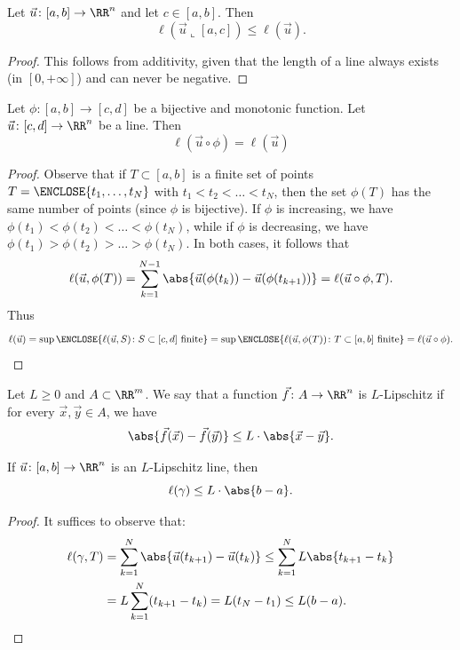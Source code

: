 \begin{corollary}[monotonicity]
Let $\vec u\colon[a,b]\to \RR^n$ and let $c\in [a,b]$. Then 
\[
\ell(\vec u \llcorner [a,c]) \le \ell(\vec u).  
\]
\end{corollary}
\begin{proof}
This follows from additivity, given that the length of a line always exists (in
$[0,+\infty]$) and can never be negative.
\end{proof}

\begin{theorem}[reparameterization]
Let $\phi\colon [a,b] \to [c,d]$ be a bijective and monotonic function. Let
$\vec u \colon [c,d]\to \RR^n$ be a line. Then
\[
 \ell(\vec u \circ \phi) = \ell(\vec u)  
\]
\end{theorem}
\begin{proof}
Observe that if $T\subset [a,b]$ is a finite set of points $T=\ENCLOSE{t_1,
\dots, t_N}$ with $t_1 < t_2 < \dots < t_N$, then the set $\phi(T)$ has the same
number of points (since $\phi$ is bijective). If $\phi$ is increasing, we have
$\phi(t_1) < \phi(t_2) < \dots < \phi(t_N)$, while if $\phi$ is decreasing, we
have $\phi(t_1) > \phi(t_2) > \dots > \phi(t_N)$. In both cases, it follows that
\[
  \ell(\vec u, \phi(T)) 
  = \sum_{k=1}^{N-1} \abs{\vec u(\phi(t_k)) - \vec u(\phi(t_{k+1}))} 
  = \ell(\vec u \circ \phi, T).
\]
Thus 
\[
\ell(\vec u) 
= \sup\ENCLOSE{\ell(\vec u, S)\colon S\subset [c,d] \text{ finite}} 
= \sup\ENCLOSE{\ell(\vec u,\phi(T))\colon T\subset [a,b] \text{ finite} }
= \ell(\vec u\circ \phi).
\]
\end{proof}

\begin{definition}
Let $L\ge 0$ and $A\subset \RR^m$. We say that a function $\vec f\colon A \to
\RR^n$ is $L$-Lipschitz if for every $\vec x, \vec y\in A$, we have
\[
  \abs{\vec f(\vec x)-\vec f(\vec y)} \le L \cdot \abs{\vec x-\vec y}.  
\]
\end{definition}

\begin{lemma}
If $\vec u \colon [a,b]\to \RR^n$ is an $L$-Lipschitz line, then 
\[
 \ell(\gamma) \le L \cdot \abs{b-a}.  
\]
\end{lemma}
\begin{proof} It suffices to observe that:
  \begin{align*}
  \ell(\gamma, T) 
  &= \sum_{k=1}^N \abs{\vec u(t_{k+1})-\vec u(t_{k})}
  \le \sum_{k=1}^N L \abs{t_{k+1}-t_k} \\
  &= L \sum_{k=1}^N (t_{k+1} - t_k)
  = L (t_N-t_1) 
  \le L (b-a).
  \end{align*}
\end{proof}


